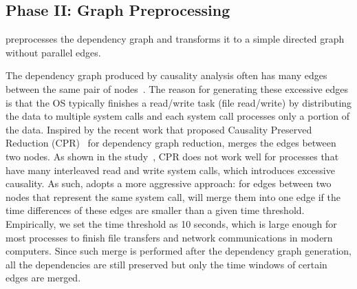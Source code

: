 % 


\subsection{Phase II: Graph Preprocessing}
\label{subsec:graph-preprocessing}

\tool 
preprocesses the dependency graph and transforms it to a simple directed graph without parallel edges.

The dependency graph produced by causality analysis often has many edges between the same pair of nodes~\cite{reduction}.
The reason for generating these excessive edges is that the OS typically finishes a read/write task (\eg file read/write) by distributing the data to multiple system calls and each system call processes only a portion of the data.
Inspired by the recent work that proposed Causality Preserved Reduction (CPR)~\cite{reduction} for dependency graph reduction, \tool merges the edges between two nodes.
As shown in the study~\cite{reduction}, CPR does not work well for processes that have many interleaved read and write system calls, which introduces excessive causality.
As such, \tool adopts a more aggressive approach: for edges between two nodes that represent the same system call, 
\tool will merge them into one edge if the time differences of these edges are smaller than a given time threshold. 
Empirically, we set the time threshold as 10 seconds, 
which is large enough for most processes to finish file transfers and network communications in modern computers. 
Since such merge is performed after the dependency graph generation, all the dependencies are still preserved but only the time windows of certain edges are merged. 


